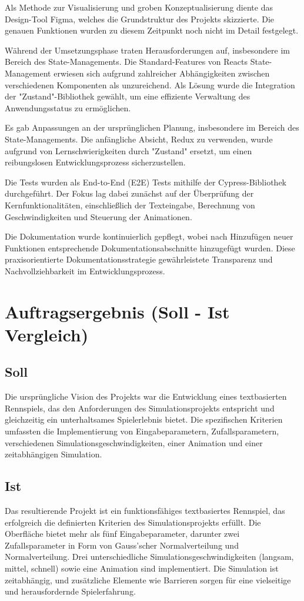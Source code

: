 \documentclass{article}
\begin{document}
Als Methode zur Visualisierung und groben Konzeptualisierung diente das Design-Tool Figma, welches die Grundstruktur des Projekts skizzierte. Die genauen Funktionen wurden zu diesem Zeitpunkt noch nicht im Detail festgelegt.

Während der Umsetzungsphase traten Herausforderungen auf, insbesondere im Bereich des State-Managements. Die Standard-Features von Reacts State-Management erwiesen sich aufgrund zahlreicher Abhängigkeiten zwischen verschiedenen Komponenten als unzureichend. Als Lösung wurde die Integration der "Zustand"-Bibliothek gewählt, um eine effiziente Verwaltung des Anwendungsstatus zu ermöglichen.

Es gab Anpassungen an der ursprünglichen Planung, insbesondere im Bereich des State-Managements. Die anfängliche Absicht, Redux zu verwenden, wurde aufgrund von Lernschwierigkeiten durch "Zustand" ersetzt, um einen reibungslosen Entwicklungsprozess sicherzustellen.

Die Tests wurden als End-to-End (E2E) Tests mithilfe der Cypress-Bibliothek durchgeführt. Der Fokus lag dabei zunächst auf der Überprüfung der Kernfunktionalitäten, einschließlich der Texteingabe, Berechnung von Geschwindigkeiten und Steuerung der Animationen.

Die Dokumentation wurde kontinuierlich gepflegt, wobei nach Hinzufügen neuer Funktionen entsprechende Dokumentationsabschnitte hinzugefügt wurden. Diese praxisorientierte Dokumentationsstrategie gewährleistete Transparenz und Nachvollziehbarkeit im Entwicklungsprozess.

\section{Auftragsergebnis (Soll - Ist Vergleich)}

\subsection{Soll}
Die ursprüngliche Vision des Projekts war die Entwicklung eines textbasierten Rennspiels, das den Anforderungen des Simulationsprojekts entspricht und gleichzeitig ein unterhaltsames Spielerlebnis bietet. Die spezifischen Kriterien umfassten die Implementierung von Eingabeparametern, Zufallsparametern, verschiedenen Simulationsgeschwindigkeiten, einer Animation und einer zeitabhängigen Simulation.

\subsection{Ist}
Das resultierende Projekt ist ein funktionsfähiges textbasiertes Rennspiel, das erfolgreich die definierten Kriterien des Simulationsprojekts erfüllt. Die Oberfläche bietet mehr als fünf Eingabeparameter, darunter zwei Zufallsparameter in Form von Gauss'scher Normalverteilung und Normalverteilung. Drei unterschiedliche Simulationsgeschwindigkeiten (langsam, mittel, schnell) sowie eine Animation sind implementiert. Die Simulation ist zeitabhängig, und zusätzliche Elemente wie Barrieren sorgen für eine vielseitige und herausfordernde Spielerfahrung.
\end{document}
